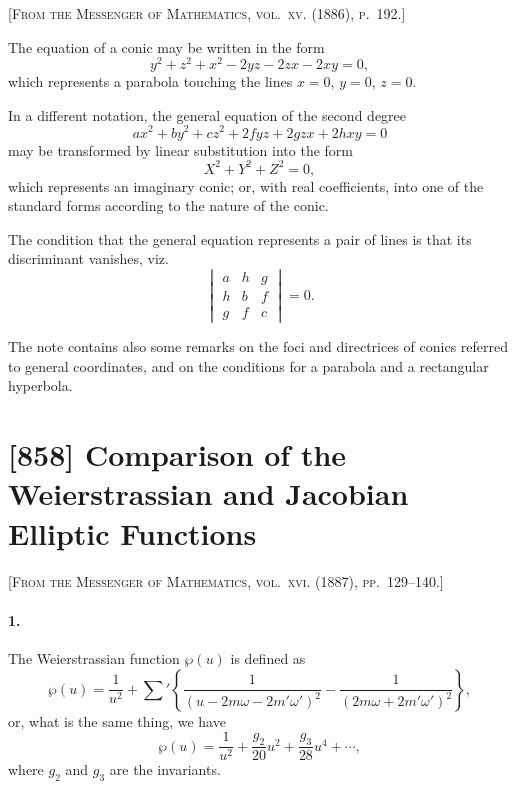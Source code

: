 \documentclass[11pt,a4paper]{book}
\begin{document}
\noindent\textsc{[From the Messenger of Mathematics, vol.~xv. (1886), p.~192.]}

\smallskip

\noindent The equation of a conic may be written in the form
\[
y^{2} + z^{2} + x^{2} - 2yz - 2zx - 2xy = 0,
\]
which represents a parabola touching the lines $x = 0$, $y = 0$, $z = 0$.

\smallskip

\noindent In a different notation, the general equation of the second degree
\[
ax^{2} + by^{2} + cz^{2} + 2fyz + 2gzx + 2hxy = 0
\]
may be transformed by linear substitution into the form
\[
X^{2} + Y^{2} + Z^{2} = 0,
\]
which represents an imaginary conic; or, with real coefficients, into one of the standard forms according to the nature of the conic.

\smallskip

\noindent The condition that the general equation represents a pair of lines is that its discriminant vanishes, viz.
\[
\begin{vmatrix}
a & h & g \\
h & b & f \\
g & f & c
\end{vmatrix} = 0.
\]

\smallskip

\noindent The note contains also some remarks on the foci and directrices of conics referred to general coordinates, and on the conditions for a parabola and a rectangular hyperbola.

\newpage
\section*{[858] Comparison of the Weierstrassian and Jacobian Elliptic Functions}

\noindent\textsc{[From the Messenger of Mathematics, vol.~xvi. (1887), pp.~129--140.]}

\smallskip

\paragraph{1.} The Weierstrassian function $\wp(u)$ is defined as
\[
\wp(u) = \frac{1}{u^{2}} + \sum'\left\{\frac{1}{(u - 2m\omega - 2m'\omega')^{2}} - \frac{1}{(2m\omega + 2m'\omega')^{2}}\right\},
\]
or, what is the same thing, we have
\[
\wp(u) = \frac{1}{u^{2}} + \frac{g_{2}}{20}u^{2} + \frac{g_{3}}{28}u^{4} + \cdots,
\]
where $g_{2}$ and $g_{3}$ are the invariants.
\end{document}

